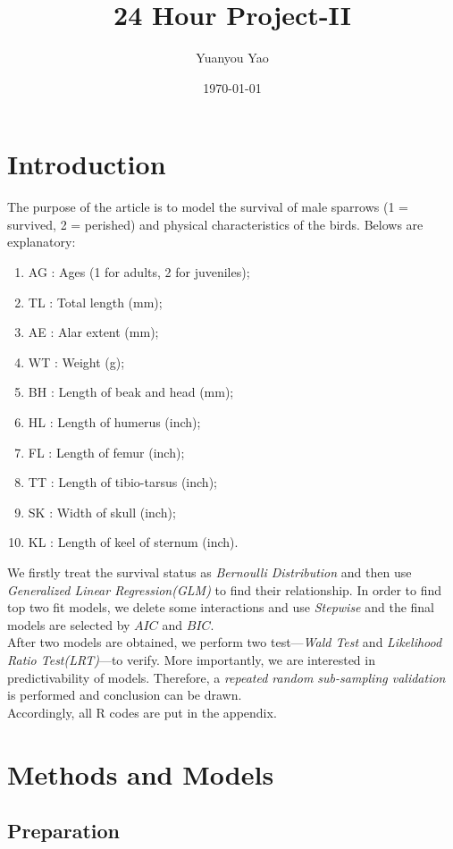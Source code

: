 \documentclass[12pt,a4paper]{article}
\title{24 Hour Project-II}
\author{Yuanyou Yao}
\date{\today}
\begin{document}
\maketitle
\tableofcontents
\section{Introduction}
The purpose of the article is to model the survival of male sparrows (1 = survived, 2 = perished) and physical characteristics of the birds. Belows are explanatory:
\begin{enumerate}
\item{AG} : Ages (1 for adults, 2 for juveniles);
\item{TL} : Total length (mm);
\item{AE} : Alar extent (mm);
\item{WT} : Weight (g);
\item{BH} : Length of beak and head (mm);
\item{HL} : Length of humerus (inch);
\item{FL} : Length of femur (inch);
\item{TT} : Length of tibio-tarsus (inch); 
\item{SK} : Width of skull (inch);
\item{KL} : Length of keel of sternum (inch).
\end{enumerate}
We firstly treat the survival status as \emph{Bernoulli Distribution} and then use \emph{Generalized Linear Regression(GLM)} to find their relationship. In order to find top two fit models, we delete some interactions and use \emph{Stepwise} and the final models are selected by $AIC$ and $BIC$.\\
\newline
After two models are obtained, we perform two test---\emph{Wald Test} and \emph{Likelihood Ratio Test(LRT)}---to verify. More importantly, we are interested in predictivability of models. Therefore, a \emph{repeated random sub-sampling validation} is performed and conclusion can be drawn.\\
\newline
 Accordingly, all R codes are put in the appendix.
\newpage
\section{Methods and Models}
\subsection{Preparation}
\end{document}
